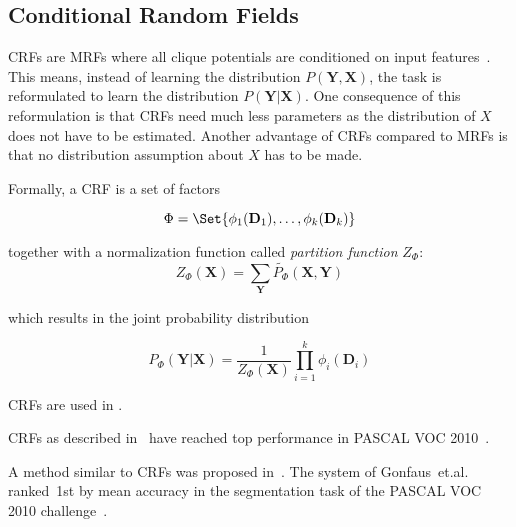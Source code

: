 \subsection{Conditional Random Fields}\label{subsec:conditional-random-fields}

\Glspl{CRF} are \glspl{MRF} where all clique potentials are conditioned on
input features~\cite{murphy2012machine}. This means, instead of learning the
distribution $P(\mathbf{Y}, \mathbf{X})$, the task is reformulated to learn the
distribution $P(\mathbf{Y}| \mathbf{X})$. One consequence of this reformulation
is that \glspl{CRF} need much less parameters as the distribution of $X$ does
not have to be estimated. Another advantage of \glspl{CRF} compared to
\glspl{MRF} is that no distribution assumption about $X$ has to be made.

Formally, a \gls{CRF} is a set of factors

\[\Phi = \Set{\phi_1(\mathbf{D}_1), \dots, \phi_k(\mathbf{D}_k)}\]

together with a normalization function called \textit{partition function} $Z_\Phi$:
\[Z_\Phi(\mathbf{X}) = \sum_{\mathbf{Y}} \tilde{P_\Phi} (\mathbf{X}, \mathbf{Y})\]

which results in the joint probability distribution

\[P_{\Phi}(\mathbf{Y} | \mathbf{X}) = \frac{1}{Z_\Phi(\mathbf{X})} \prod_{i=1}^k \phi_i(\mathbf{D}_i)\]


\Glspl{CRF} are used in \cite{multiscale04,shotton2006textonboost}.

\Glspl{CRF} as described in~\cite{associative09} have reached top performance
in PASCAL VOC 2010~\cite{VOC2010Results}.


A method similar to \glspl{CRF} was proposed in~\cite{gonfaus2010harmony}.
The system of Gonfaus~et.al. ranked~1st by mean accuracy in the segmentation
task of the PASCAL VOC 2010 challenge~\cite{everingham2010pascal}.
